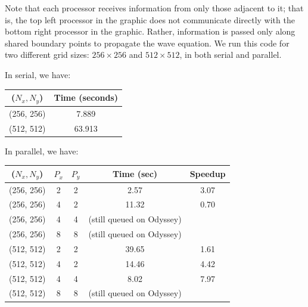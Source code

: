 \documentclass[letterpaper,12pt]{article}
\begin{document}
Note that each processor receives information from only those adjacent to it; that is, the top left processor in the graphic does not communicate directly with the bottom right processor in the graphic. Rather, information is passed only along shared boundary points to propagate the wave equation. We run this code for two different grid sizes: $256\times 256$ and $512\times 512$, in both serial and parallel.

In serial, we have:

\begin{center}
\begin{tabular}{|c|c|} \hline
($N_x, N_y$) & Time (seconds)\\ \hline
(256, 256) & 7.889\\ \hline %
(512, 512) & 63.913\\ \hline %
\end{tabular}
\end{center}

In parallel, we have:

\begin{center}
\begin{tabular}{|c|c|c|c|c|} \hline
($N_x, N_y$) & $P_x$ & $P_y$ & Time (sec) & Speedup \\ \hline
(256, 256) & 2 & 2 & 2.57 & 3.07\\ \hline %
(256, 256) & 4 & 2 & 11.32 & 0.70\\ \hline %
(256, 256) & 4 & 4 & (still queued on Odyssey) & \\ \hline %
(256, 256) & 8 & 8 & (still queued on Odyssey)& \\ \hline %
(512, 512) & 2 & 2 & 39.65 & 1.61\\ \hline %
(512, 512) & 4 & 2 & 14.46 & 4.42\\ \hline %
(512, 512) & 4 & 4 & 8.02 & 7.97\\ \hline 
(512, 512) & 8 & 8 & (still queued on Odyssey)&\\ \hline 
\end{tabular}
\end{center}
\end{document}
